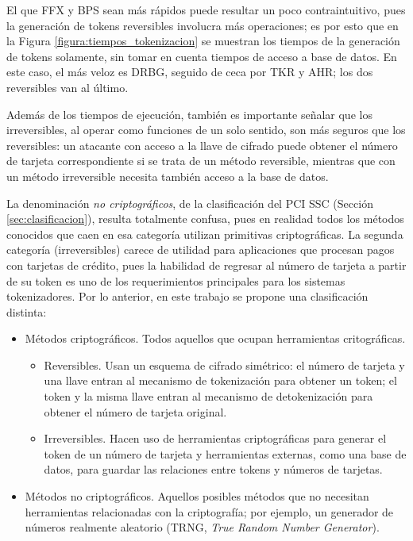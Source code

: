 El que FFX y BPS sean más rápidos puede resultar un poco contraintuitivo, pues
la generación de tokens reversibles involucra más operaciones; es por esto que
en la Figura \ref{figura:tiempos_tokenizacion} se muestran los tiempos de la
generación de tokens solamente, sin tomar en cuenta tiempos de acceso a base de
datos. En este caso, el más veloz es DRBG, seguido de ceca por TKR y AHR; los
dos reversibles van al último.

Además de los tiempos de ejecución, también es importante señalar que los
irreversibles, al operar como funciones de un solo sentido, son más
seguros que los reversibles: un atacante con acceso a la llave de cifrado puede
obtener el número de tarjeta correspondiente si se trata de un método
reversible, mientras que con un método irreversible necesita también acceso a la
base de datos.


La denominación \textit{no criptográficos}, de la clasificación del PCI SSC
(Sección \ref{sec:clasificacion}), resulta totalmente confusa, pues en
realidad todos los métodos conocidos que caen en esa categoría utilizan
primitivas criptográficas. La segunda categoría (irreversibles) carece de
utilidad para aplicaciones que procesan pagos con tarjetas de crédito, pues la
habilidad de regresar al número de tarjeta a partir de su token es uno de los
requerimientos principales para los sistemas tokenizadores. Por lo anterior, en
este trabajo se propone una clasificación distinta:

\begin{itemize}
  \item Métodos criptográficos. Todos aquellos que ocupan herramientas
    critográficas.
    \begin{itemize}
      \item Reversibles. Usan un esquema de cifrado simétrico: el número
        de tarjeta y una llave entran al mecanismo de tokenización para obtener
        un token; el token y la misma llave entran al mecanismo de
        detokenización para obtener el número de tarjeta original.
      \item Irreversibles. Hacen uso de herramientas criptográficas para generar
	el token de un número de tarjeta y herramientas externas, como una
        base de datos, para guardar las relaciones entre tokens y números de
        tarjetas.
    \end{itemize}
  \item Métodos no criptográficos. Aquellos posibles métodos que no necesitan
    herramientas relacionadas con la criptografía; por ejemplo, un generador de
    números realmente aleatorio (TRNG, \textit{True Random Number Generator}).
\end{itemize}

